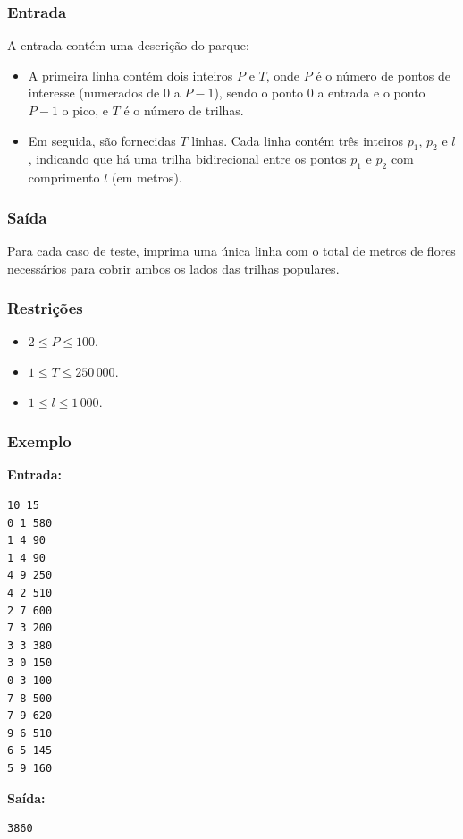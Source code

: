\subsubsection*{Entrada}
A entrada contém uma descrição do parque:
\begin{itemize}
    \item A primeira linha contém dois inteiros \(P\) e \(T\), onde \(P\) é o número de pontos de interesse (numerados de 0 a \(P-1\)), sendo o ponto 0 a entrada e o ponto \(P-1\) o pico, e \(T\) é o número de trilhas.
    \item Em seguida, são fornecidas \(T\) linhas. Cada linha contém três inteiros \(p_1\), \(p_2\) e \(l\), indicando que há uma trilha bidirecional entre os pontos \(p_1\) e \(p_2\) com comprimento \(l\) (em metros).
\end{itemize}

\subsubsection*{Saída}
Para cada caso de teste, imprima uma única linha com o total de metros de flores necessários para cobrir ambos os lados das trilhas populares.

\subsubsection*{Restrições}
\begin{itemize}
    \item \(2 \le P \le 100\).
    \item \(1 \le T \le 250\,000\).
    \item \(1 \le l \le 1\,000\).
\end{itemize}

\subsubsection*{Exemplo}

\textbf{Entrada:}
\begin{verbatim}
10 15
0 1 580
1 4 90
1 4 90
4 9 250
4 2 510
2 7 600
7 3 200
3 3 380
3 0 150
0 3 100
7 8 500
7 9 620
9 6 510
6 5 145
5 9 160
\end{verbatim}

\textbf{Saída:}
\begin{verbatim}
3860
\end{verbatim}

